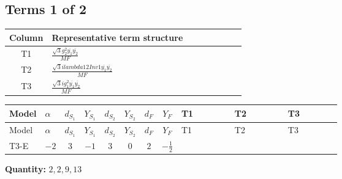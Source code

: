 \documentclass[8pt]{article}
\begin{document}
\begin{landscape}
\subsection*{Terms 1 of 2}
\begin{center}
\begin{tabular}{@{}c >{\raggedright\arraybackslash}p{0.82\linewidth}@{}}
\toprule
Column & Representative term structure \\
\midrule
T1 & \(\displaystyle \frac{\sqrt{3} g_{2}^{2} \overline{y_{1}} \overline{y_{2}}}{MF}\) \\
\midrule
T2 & \(\displaystyle \frac{\sqrt{3} i lambda12Inv1 \overline{y_{1}} \overline{y_{2}}}{MF}\) \\
\midrule
T3 & \(\displaystyle \frac{\sqrt{3} i g_{1}^{2} \overline{y_{1}} \overline{y_{2}}}{MF}\) \\
\midrule
\bottomrule
\end{tabular}
\end{center}
\smallskip
\tiny
\begin{longtable}{@{}llcccccc >{\raggedright\arraybackslash}p{0.21\linewidth} >{\raggedright\arraybackslash}p{0.21\linewidth} >{\raggedright\arraybackslash}p{0.21\linewidth}@{}}
\toprule
Model & $\alpha$ & $d_{S_1}$ & $Y_{S_1}$ & $d_{S_2}$ & $Y_{S_2}$ & $d_F$ & $Y_F$ & T1 & T2 & T3 \\
\midrule
\endfirsthead
\toprule
Model & $\alpha$ & $d_{S_1}$ & $Y_{S_1}$ & $d_{S_2}$ & $Y_{S_2}$ & $d_F$ & $Y_F$ & T1 & T2 & T3 \\
\midrule
\endhead
T3-E & $-2$ & $3$ & $-1$ & $3$ & $0$ & $2$ & $-\frac{1}{2}$ & \scriptsize\adjustbox{max width=\linewidth}{$\begin{gathered} - \frac{\sqrt{3} g_{2}^{2} \overline{y_{1}} \overline{y_{2}}}{6 MF}\end{gathered}$} & \scriptsize\adjustbox{max width=\linewidth}{$\begin{gathered} - \frac{\sqrt{3} i lambda12Inv1 \overline{y_{1}} \overline{y_{2}}}{6 MF}\end{gathered}$} & \scriptsize\adjustbox{max width=\linewidth}{$\begin{gathered} \frac{\sqrt{3} i g_{1}^{2} \overline{y_{1}} \overline{y_{2}}}{8 MF}\end{gathered}$} \\
\midrule
\bottomrule
\end{longtable}
\clearpage
\noindent\textbf{Quantity: }$\mathrm{2,2,9,13}$\par\smallskip

\end{landscape}
\end{document}
